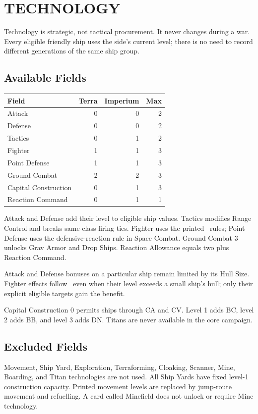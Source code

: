 \section{TECHNOLOGY}

Technology is strategic, not tactical procurement. It never changes during a
war. Every eligible friendly ship uses the side's current level; there is no
need to record different generations of the same ship group.

\subsection{Available Fields}

\begin{tabular}{@{}lrrr@{}}
\toprule
Field & Terra & Imperium & Max \\
\midrule
Attack & 0 & 0 & 2 \\
Defense & 0 & 0 & 2 \\
Tactics & 0 & 1 & 2 \\
Fighter & 1 & 1 & 3 \\
Point Defense & 1 & 1 & 3 \\
Ground Combat & 2 & 2 & 3 \\
Capital Construction & 0 & 1 & 3 \\
Reaction Command & 0 & 1 & 1 \\
\bottomrule
\end{tabular}

Attack and Defense add their level to eligible ship values. Tactics modifies
Range Control and breaks same-class firing ties. Fighter uses the printed
\SpaceEmpires\ rules; Point Defense uses the defensive-reaction rule in Space
Combat. Ground Combat 3 unlocks Grav Armor and Drop Ships. Reaction Allowance
equals two plus Reaction Command.

Attack and Defense bonuses on a particular ship remain limited by its Hull
Size. Fighter effects follow \SpaceEmpires\ even when their level exceeds a
small ship's hull; only their explicit eligible targets gain the benefit.

Capital Construction 0 permits ships through CA and CV. Level 1 adds BC,
level 2 adds BB, and level 3 adds DN. Titans are never available in the core
campaign.

\subsection{Excluded Fields}

Movement, Ship Yard, Exploration, Terraforming, Cloaking, Scanner, Mine,
Boarding, and Titan technologies are not used. All Ship Yards have fixed
level-1 construction capacity. Printed movement levels are replaced by
jump-route movement and refuelling. A card called Minefield does not unlock or
require Mine technology.

